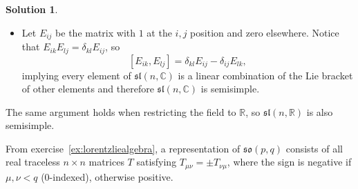 \documentclass[11pt, a4paper]{report}
\theoremstyle{definition}
\newtheorem{solution}{Solution}[part]
\newenvironment{sol}{\begin{solution}}{\end{solution}\pagebreak[3]}
\begin{document}
\begin{sol}
\begin{itemize}
    \item Let $E_{ij}$ be the matrix with $1$ at the $i, j$ position and zero elsewhere.
    Notice that $E_{ik} E_{lj} = \delta_{kl} E_{ij}$, so
    \[
        [E_{ik}, E_{lj}] = \delta_{kl} E_{ij} - \delta_{ij} E_{lk},
    \]
    implying every element of $\mathfrak{sl}(n, \mathbb{C})$ is a linear combination of the Lie bracket of other elements and therefore $\mathfrak{sl}(n, \mathbb{C})$ is semisimple.

\end{itemize}

The same argument holds when restricting the field to $\mathbb{R}$, so $\mathfrak{sl}(n, \mathbb{R})$ is also semisimple.

From exercise~\ref{ex:lorentzliealgebra}, a representation of $\mathfrak{so}(p, q)$ consists of all real traceless $n \times n$ matrices $T$ satisfying $T_{\mu\nu} = \pm T_{\nu\mu}$, where the sign is negative if $\mu, \nu < q$ (0-indexed), otherwise positive.


\end{sol}
\end{document}
